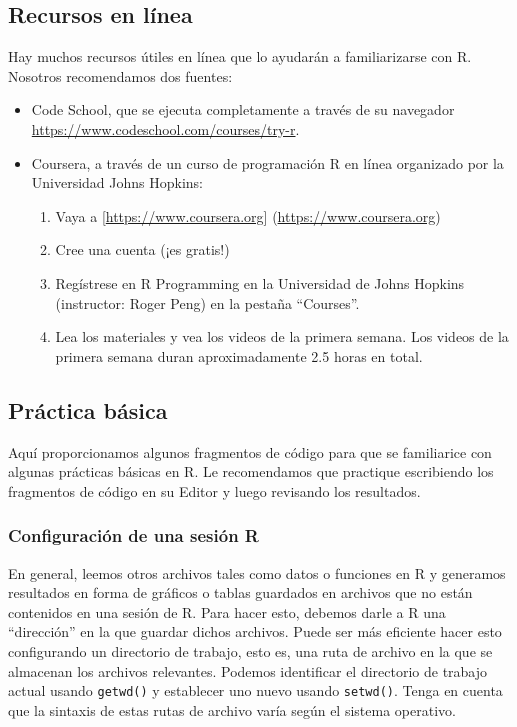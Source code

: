 \documentclass[12pt,spanish,]{book}
\providecommand{\tightlist}{%
  \setlength{\itemsep}{0pt}\setlength{\parskip}{0pt}}
\begin{document}
\hypertarget{recursos-en-luxednea}{%
\subsection{Recursos en línea}\label{recursos-en-luxednea}}

Hay muchos recursos útiles en línea que lo ayudarán a familiarizarse con R. Nosotros recomendamos dos fuentes:

\begin{itemize}
\tightlist
\item
  Code School, que se ejecuta completamente a través de su navegador \url{https://www.codeschool.com/courses/try-r}.
\item
  Coursera, a través de un curso de programación R en línea organizado por la Universidad Johns Hopkins:

  \begin{enumerate}
  \def\labelenumi{\roman{enumi}.}
  \tightlist
  \item
    Vaya a {[}\url{https://www.coursera.org}{]} (\url{https://www.coursera.org})
  \item
    Cree una cuenta (¡es gratis!)
  \item
    Regístrese en R Programming en la Universidad de Johns Hopkins (instructor: Roger Peng) en la pestaña ``Courses''.
  \item
    Lea los materiales y vea los videos de la primera semana. Los videos de la primera semana duran aproximadamente 2.5 horas en total.
  \end{enumerate}
\end{itemize}

\hypertarget{pruxe1ctica-buxe1sica}{%
\subsection{Práctica básica}\label{pruxe1ctica-buxe1sica}}

Aquí proporcionamos algunos fragmentos de código para que se familiarice con algunas prácticas básicas en R. Le recomendamos que practique escribiendo los fragmentos de código en su Editor y luego revisando los resultados.

\hypertarget{configuraciuxf3n-de-una-sesiuxf3n-r}{%
\subsubsection{Configuración de una sesión R}\label{configuraciuxf3n-de-una-sesiuxf3n-r}}

En general, leemos otros archivos tales como datos o funciones en R y generamos resultados en forma de gráficos o tablas guardados en archivos que no están contenidos en una sesión de R. Para hacer esto, debemos darle a R una ``dirección'' en la que guardar dichos archivos. Puede ser más eficiente hacer esto configurando un directorio de trabajo, esto es, una ruta de archivo en la que se almacenan los archivos relevantes. Podemos identificar el directorio de trabajo actual usando \texttt{getwd()} y establecer uno nuevo usando \texttt{setwd()}. Tenga en cuenta que la sintaxis de estas rutas de archivo varía según el sistema operativo.
\end{document}
